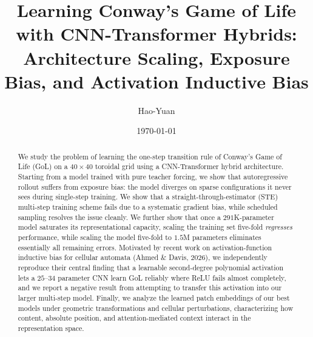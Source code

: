 \documentclass[11pt]{article}
\title{Learning Conway's Game of Life with CNN-Transformer Hybrids:\\
Architecture Scaling, Exposure Bias, and Activation Inductive Bias}
\author{Hao-Yuan}
\date{\today}
\begin{document}
\maketitle

\begin{abstract}
We study the problem of learning the one-step transition rule of Conway's
Game of Life (GoL) on a $40\times40$ toroidal grid using a CNN-Transformer
hybrid architecture. Starting from a model trained with pure teacher forcing,
we show that autoregressive rollout suffers from exposure bias: the model
diverges on sparse configurations it never sees during single-step training.
We show that a straight-through-estimator (STE) multi-step training scheme
fails due to a systematic gradient bias, while scheduled sampling resolves
the issue cleanly. We further show that once a $291$K-parameter model
saturates its representational capacity, scaling the training set five-fold
\emph{regresses} performance, while scaling the model five-fold to $1.5$M
parameters eliminates essentially all remaining errors. Motivated by recent
work on activation-function inductive bias for cellular automata
(Ahmed \& Davis, 2026), we independently reproduce their central finding
that a learnable second-degree polynomial activation lets a $25$--$34$
parameter CNN learn GoL reliably where ReLU fails almost completely, and we
report a negative result from attempting to transfer this activation into
our larger multi-step model. Finally, we analyze the learned patch
embeddings of our best models under geometric transformations and cellular
perturbations, characterizing how content, absolute position, and
attention-mediated context interact in the representation space.
\end{abstract}

\tableofcontents











\end{document}
